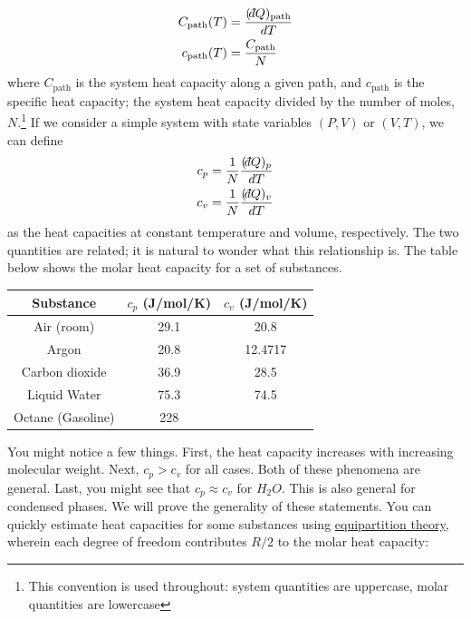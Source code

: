 \documentclass[12pt]{article}
\def\dbar{{\mathchar'26\mkern-12mu d}}
\begin{document}
\begin{align*}
C_\text{path} (T) &= \frac{(\dbar Q)_\text{path}}{dT}\\
c_\text{path} (T) &= \frac{C_\text{path}}{N} %
\end{align*}
where $C_\text{path}$ is the system heat capacity along a given path, and $c_\text{path}$ is the specific heat capacity; the system heat capacity divided by the number of moles, $N$.\footnote{This convention is used throughout: system quantities are uppercase, molar quantities are lowercase}   If we consider a simple system with state variables $(P,V)$ or $(V,T)$, we can define
\begin{align*}
c_p &= \frac{1}{N} \frac{(\dbar Q)_p}{dT}\\
c_v &=  \frac{1}{N} \frac{(\dbar Q)_v}{dT}
\end{align*}
as the heat capacities at constant temperature and volume, respectively. The two quantities are related; it is natural to wonder what this relationship is. %
The table below shows the molar heat capacity for a set of substances.
\begin{center}
\begin{tabular}{ c|c|c } 
 Substance & $c_p$ (J/mol/K)& $c_v$ (J/mol/K) \\ 
 \hline
 Air (room) & 29.1 & 20.8 \\ 
 Argon & 20.8 & 12.4717 \\ 
 Carbon dioxide & 36.9 & 28.5\\
 Liquid Water & 75.3 & 74.5\\
 Octane (Gasoline) & 228 &  \\
\end{tabular}
\end{center}

You might notice a few things. First, the heat capacity increases with increasing molecular weight. Next, $c_p > c_v$ for all cases. Both of these phenomena are general. Last, you might see that $c_p \approx c_v$ for $H_2O$. This is also general for condensed phases. We will prove the generality of these statements. %
You can quickly estimate heat capacities for some substances using \href{http://en.wikipedia.org/wiki/Equipartition_theorem}{equipartition theory}, wherein each degree of freedom contributes $R/2$ to the molar heat capacity:
\end{document}
